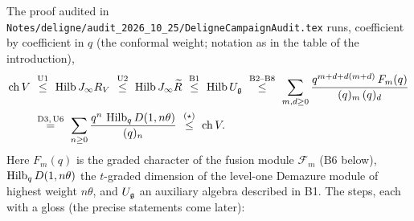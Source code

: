 The proof audited in \texttt{Notes/deligne/audit\_2026\_10\_25/DeligneCampaignAudit.tex} runs, coefficient
by coefficient in $q$ (the conformal weight; notation as in the table of the introduction),
\begin{equation}\label{l24:eq:chain}
\begin{aligned}
\ltwentyfourch V\ &\overset{\mathrm{U1}}{\le}\ \ltwentyfourHilb\ltwentyfourJ R_V\ \overset{\mathrm{U2}}{\le}\ \ltwentyfourHilb\ltwentyfourJ\ltwentyfourRt
\ \overset{\mathrm{B1}}{\le}\ \ltwentyfourHilb U_{\ltwentyfourg}
\ \overset{\mathrm{B2\text{--}B8}}{\le}\ \sum_{m,d\ge0}\frac{q^{m+d+d(m+d)}\,F_m(q)}{(q)_m\,(q)_d}\\
&\overset{\mathrm{D3,\,U6}}{=}\ \sum_{n\ge0}\frac{q^n\,\ltwentyfourHilb_qD(1,n\theta)}{(q)_n}
\ \overset{(\star)}{\le}\ \ltwentyfourch V .
\end{aligned}
\end{equation}
Here $F_m(q)$ is the graded character of the fusion module $\mathcal F_m$ (B6 below), $\operatorname{Hilb}_qD(1,n\theta)$
the $t$-graded dimension of the level-one Demazure module of highest weight $n\theta$, and $U_{\mathfrak g}$ an
auxiliary algebra described in B1. The steps, each with a gloss (the precise statements come later):
